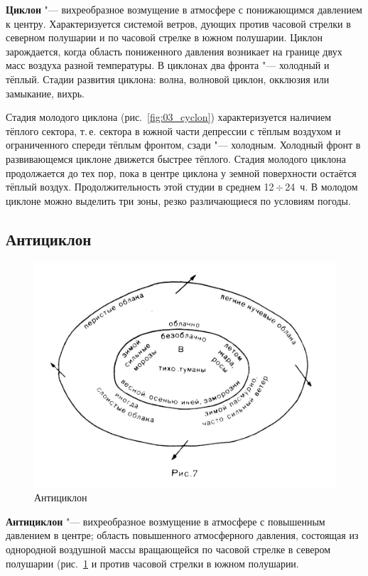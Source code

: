 \documentclass[a4paper, 12pt, twoside, draft, book, russian, fittopage, cyremdash, openright]{ncc}
\newcommand{\otdo}{\,\ensuremath{\div}\,}
\begin{document}
\textbf{Циклон} "--- вихреобразное возмущение в
атмосфере с понижающимся давлением к центру. Характеризуется системой
ветров, дующих против часовой стрелки в северном полушарии и по
часовой стрелке в южном полушарии. Циклон зарождается, когда область
пониженного давления возникает на границе двух масс воздуха разной
температуры. В циклонах два фронта "--- холодный и тёплый. Стадии
развития циклона: волна, волновой циклон, окклюзия или замыкание,
вихрь.

Стадия молодого циклона (рис.~\ref{fig:03_cyclon}) характеризуется
наличием тёплого сектора, т.\,е. сектора в южной части депрессии с
тёплым воздухом и ограниченного спереди тёплым фронтом, сзади "---
холодным. Холодный фронт в развивающемся циклоне движется быстрее
тёплого. Стадия молодого циклона продолжается до тех пор, пока в
центре циклона у земной поверхности остаётся тёплый
воздух. Продолжительность этой студии в среднем 12\otdo24~ч. В молодом
циклоне можно выделить три зоны, резко различающиеся по условиям
погоды.

\subsection{Антициклон}
\label{sec:anticyclon}

\begin{figure}[htb]
   \centering
   \includegraphics[scale=1.0]{04_anticyclon.pdf}
   \caption{Антициклон}
   \label{fig:04_anticyclon}
\end{figure}

\textbf{Антициклон} "--- вихреобразное возмущение в
атмосфере с повышенным давлением в центре; область повышенного
атмосферного давления, состоящая из однородной воздушной массы
вращающейся по часовой стрелке в севером полушарии
(рис.~\ref{fig:04_anticyclon} и против часовой стрелки в южном
полушарии.
\end{document}
